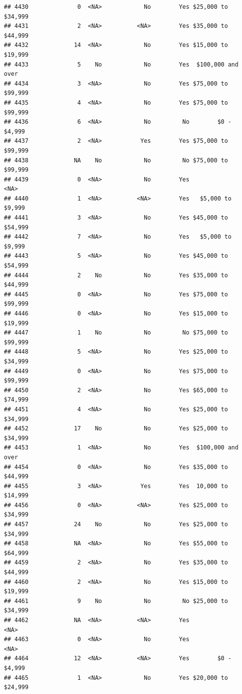 \documentclass[man]{apa6}
\begin{document}
\begin{verbatim}
## 4430              0  <NA>            No        Yes $25,000 to $34,999
## 4431              2  <NA>          <NA>        Yes $35,000 to $44,999
## 4432             14  <NA>            No        Yes $15,000 to $19,999
## 4433              5    No            No        Yes  $100,000 and over
## 4434              3  <NA>            No        Yes $75,000 to $99,999
## 4435              4  <NA>            No        Yes $75,000 to $99,999
## 4436              6  <NA>            No         No        $0 - $4,999
## 4437              2  <NA>           Yes        Yes $75,000 to $99,999
## 4438             NA    No            No         No $75,000 to $99,999
## 4439              0  <NA>            No        Yes               <NA>
## 4440              1  <NA>          <NA>        Yes   $5,000 to $9,999
## 4441              3  <NA>            No        Yes $45,000 to $54,999
## 4442              7  <NA>            No        Yes   $5,000 to $9,999
## 4443              5  <NA>            No        Yes $45,000 to $54,999
## 4444              2    No            No        Yes $35,000 to $44,999
## 4445              0  <NA>            No        Yes $75,000 to $99,999
## 4446              0  <NA>            No        Yes $15,000 to $19,999
## 4447              1    No            No         No $75,000 to $99,999
## 4448              5  <NA>            No        Yes $25,000 to $34,999
## 4449              0  <NA>            No        Yes $75,000 to $99,999
## 4450              2  <NA>            No        Yes $65,000 to $74,999
## 4451              4  <NA>            No        Yes $25,000 to $34,999
## 4452             17    No            No        Yes $25,000 to $34,999
## 4453              1  <NA>            No        Yes  $100,000 and over
## 4454              0  <NA>            No        Yes $35,000 to $44,999
## 4455              3  <NA>           Yes        Yes  10,000 to $14,999
## 4456              0  <NA>          <NA>        Yes $25,000 to $34,999
## 4457             24    No            No        Yes $25,000 to $34,999
## 4458             NA  <NA>            No        Yes $55,000 to $64,999
## 4459              2  <NA>            No        Yes $35,000 to $44,999
## 4460              2  <NA>            No        Yes $15,000 to $19,999
## 4461              9    No            No         No $25,000 to $34,999
## 4462             NA  <NA>          <NA>        Yes               <NA>
## 4463              0  <NA>            No        Yes               <NA>
## 4464             12  <NA>          <NA>        Yes        $0 - $4,999
## 4465              1  <NA>            No        Yes $20,000 to $24,999

\end{verbatim}
\end{document}
